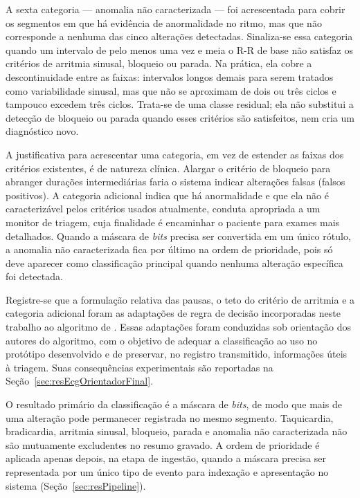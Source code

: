 A sexta categoria --- anomalia não caracterizada --- foi acrescentada para cobrir os segmentos em que há evidência de anormalidade no ritmo, mas que não corresponde a nenhuma das cinco alterações detectadas. Sinaliza-se essa categoria quando um intervalo de pelo menos uma vez e meia o R-R de base não satisfaz os critérios de arritmia sinusal, bloqueio ou parada. Na prática, ela cobre a descontinuidade entre as faixas: intervalos longos demais para serem tratados como variabilidade sinusal, mas que não se aproximam de dois ou três ciclos e tampouco excedem três ciclos. Trata-se de uma classe residual; ela não substitui a detecção de bloqueio ou parada quando esses critérios são satisfeitos, nem cria um diagnóstico novo.

A justificativa para acrescentar uma categoria, em vez de estender as faixas dos critérios existentes, é de natureza clínica. Alargar o critério de bloqueio para abranger durações intermediárias faria o sistema indicar alterações falsas (falsos positivos). A categoria adicional indica que há anormalidade e que ela não é caracterizável pelos critérios usados atualmente, conduta apropriada a um monitor de triagem, cuja finalidade é encaminhar o paciente para exames mais detalhados. Quando a máscara de \textit{bits} precisa ser convertida em um único rótulo, a anomalia não caracterizada fica por último na ordem de prioridade, pois só deve aparecer como classificação principal quando nenhuma alteração específica foi detectada.

Registre-se que a formulação relativa das pausas, o teto do critério de arritmia e a categoria adicional foram as adaptações de regra de decisão incorporadas neste trabalho ao algoritmo de \citet{moraesFirmwareECG}. Essas adaptações foram conduzidas sob orientação dos autores do algoritmo, com o objetivo de adequar a classificação ao uso no protótipo desenvolvido e de preservar, no registro transmitido, informações úteis à triagem. Suas consequências experimentais são reportadas na Seção~\ref{sec:resEcgOrientadorFinal}.

O resultado primário da classificação é a máscara de \textit{bits}, de modo que mais de uma alteração pode permanecer registrada no mesmo segmento. Taquicardia, bradicardia, arritmia sinusal, bloqueio, parada e anomalia não caracterizada não são mutuamente excludentes no resumo gravado. A ordem de prioridade é aplicada apenas depois, na etapa de ingestão, quando a máscara precisa ser representada por um único tipo de evento para indexação e apresentação no sistema (Seção~\ref{sec:resPipeline}).

